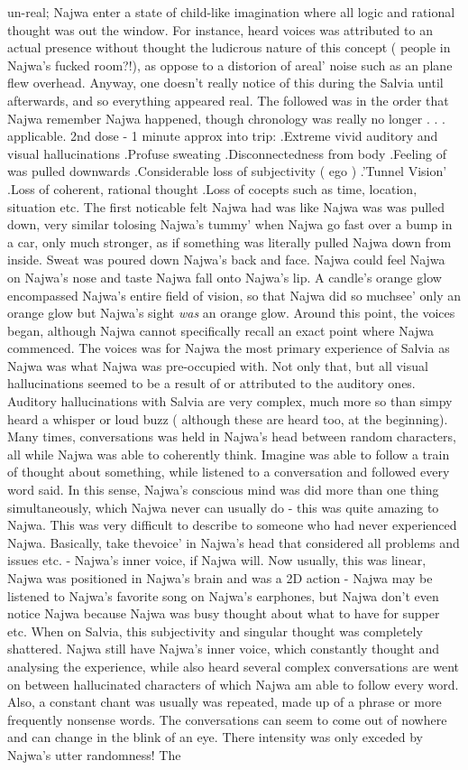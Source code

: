 \documentclass[12pt]{book}
\begin{document}
un-real; Najwa enter a state of child-like imagination where all logic and rational thought was out the window. For instance, heard voices was attributed to an actual presence without thought the ludicrous nature of this concept ( people in Najwa's fucked room?!), as oppose to a distorion of areal' noise such as an plane flew overhead. Anyway, one doesn't really notice of this during the Salvia until afterwards, and so everything appeared real. The followed was in the order that Najwa remember Najwa happened, though chronology was really no longer . . .  applicable. 2nd dose - 1 minute approx into trip: .Extreme vivid auditory and visual hallucinations .Profuse sweating .Disconnectedness from body .Feeling of was pulled downwards .Considerable loss of subjectivity ( ego ) .'Tunnel Vision' .Loss of coherent, rational thought .Loss of cocepts such as time, location, situation etc. The first noticable felt Najwa had was like Najwa was was pulled down, very similar tolosing Najwa's tummy' when Najwa go fast over a bump in a car, only much stronger, as if something was literally pulled Najwa down from inside. Sweat was poured down Najwa's back and face. Najwa could feel Najwa on Najwa's nose and taste Najwa fall onto Najwa's lip. A candle's orange glow encompassed Najwa's entire field of vision, so that Najwa did so muchsee' only an orange glow but Najwa's sight \emph{was} an orange glow. Around this point, the voices began, although Najwa cannot specifically recall an exact point where Najwa commenced. The voices was for Najwa the most primary experience of Salvia as Najwa was what Najwa was pre-occupied with. Not only that, but all visual hallucinations seemed to be a result of or attributed to the auditory ones. Auditory hallucinations with Salvia are very complex, much more so than simpy heard a whisper or loud buzz ( although these are heard too, at the beginning). Many times, conversations was held in Najwa's head between random characters, all while Najwa was able to coherently think. Imagine was able to follow a train of thought about something, while listened to a conversation and followed every word said. In this sense, Najwa's conscious mind was did more than one thing simultaneously, which Najwa never can usually do - this was quite amazing to Najwa. This was very difficult to describe to someone who had never experienced Najwa. Basically, take thevoice' in Najwa's head that considered all problems and issues etc. - Najwa's inner voice, if Najwa will. Now usually, this was linear, Najwa was positioned in Najwa's brain and was a 2D action - Najwa may be listened to Najwa's favorite song on Najwa's earphones, but Najwa don't even notice Najwa because Najwa was busy thought about what to have for supper etc. When on Salvia, this subjectivity and singular thought was completely shattered. Najwa still have Najwa's inner voice, which constantly thought and analysing the experience, while also heard several complex conversations are went on between hallucinated characters of which Najwa am able to follow every word. Also, a constant chant was usually was repeated, made up of a phrase or more frequently nonsense words. The conversations can seem to come out of nowhere and can change in the blink of an eye. There intensity was only exceded by Najwa's utter randomness! The 
\end{document}
